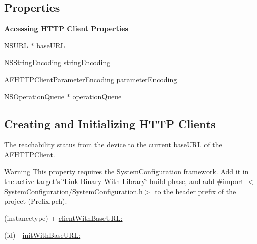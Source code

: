 \subsection*{Properties}
\begin{Indent}{\bf Accessing H\-T\-T\-P Client Properties}\par
{\em 

 

 }\begin{DoxyCompactItemize}
\item 
N\-S\-U\-R\-L $\ast$ \hyperlink{interface_a_f_h_t_t_p_client_a10347c37bd9c3d7739edee9cfa0bbd4e}{base\-U\-R\-L}
\item 
N\-S\-String\-Encoding \hyperlink{interface_a_f_h_t_t_p_client_a77951c40c6ec24f1c041544a105245c8}{string\-Encoding}
\item 
\hyperlink{_a_f_h_t_t_p_client_8h_a0a1fc2aa2881237fa65e82e1db8adebf}{A\-F\-H\-T\-T\-P\-Client\-Parameter\-Encoding} \hyperlink{interface_a_f_h_t_t_p_client_a696a776a0dce80bf3b848b3599ff8e6c}{parameter\-Encoding}
\item 
N\-S\-Operation\-Queue $\ast$ \hyperlink{interface_a_f_h_t_t_p_client_a95c209c8af8f8b631463be6a4abf3eac}{operation\-Queue}
\end{DoxyCompactItemize}
\end{Indent}
\subsection*{Creating and Initializing H\-T\-T\-P Clients}
\label{_amgrp73a7335449da7adff927a7dcf1e747d6}%
The reachability status from the device to the current {\ttfamily base\-U\-R\-L} of the {\ttfamily \hyperlink{interface_a_f_h_t_t_p_client}{A\-F\-H\-T\-T\-P\-Client}}.

\begin{DoxyWarning}{Warning}
This property requires the {\ttfamily System\-Configuration} framework. Add it in the active target's \char`\"{}\-Link Binary With Library\char`\"{} build phase, and add {\ttfamily \#import $<$System\-Configuration/\-System\-Configuration.\-h$>$} to the header prefix of the project ({\ttfamily Prefix.\-pch}).-\/-\/-\/-\/-\/-\/-\/-\/-\/-\/-\/-\/-\/-\/-\/-\/-\/-\/-\/-\/-\/-\/-\/-\/-\/-\/-\/-\/-\/-\/-\/-\/-\/-\/-\/-\/-\/-\/-\/-\/-\/-\/--- 

 
\end{DoxyWarning}
\begin{DoxyCompactItemize}
\item 
(instancetype) + \hyperlink{interface_a_f_h_t_t_p_client_a9418ae99000eebfa48721b441ce4c0d8}{client\-With\-Base\-U\-R\-L\-:}
\item 
(id) -\/ \hyperlink{interface_a_f_h_t_t_p_client_ab64334f06c3de683a7c67dc980d0c920}{init\-With\-Base\-U\-R\-L\-:}
\end{DoxyCompactItemize}


